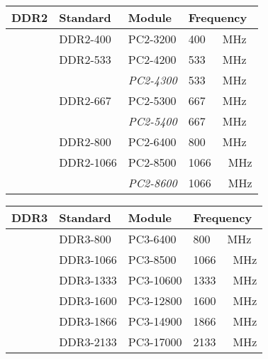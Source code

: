 \documentclass[a4paper]{article}
\newcommand{\mhz}[1]{\si{\num{#1}\ \mega\hertz}}
\begin{document}
	\begin{minipage}[t]{.4\textwidth}
		\raggedleft
		\begin{table}[H]
			\def\arraystretch{2}
			\begin{tabular}{l l l l}
				DDR2 & Standard         & Module          & Frequency \\ \hline
				& DDR2-400 & PC2-3200 & \mhz{400} \\
				& DDR2-533 & PC2-4200 & \mhz{533} \\
				&  & \textit{PC2-4300} & \mhz{533} \\
				& DDR2-667 & PC2-5300 & \mhz{667} \\
				& & \textit{PC2-5400} & \mhz{667} \\
				& DDR2-800 & PC2-6400 & \mhz{800} \\
				& DDR2-1066 & PC2-8500 & \mhz{1066} \\
				& & \textit{PC2-8600} & \mhz{1066} \\
				\hline
			\end{tabular}
		\end{table}
	
		\begin{table}[H]
			\def\arraystretch{2}
			\begin{tabular}{l l l l}
				DDR3 & Standard         & Module          & Frequency \\ \hline
				& DDR3-800 & PC3-6400 & \mhz{800} \\
				& DDR3-1066 & PC3-8500 & \mhz{1066} \\
				& DDR3-1333 & PC3-10600 & \mhz{1333} \\
				& DDR3-1600 & PC3-12800 & \mhz{1600} \\
				& DDR3-1866 & PC3-14900 & \mhz{1866} \\
				& DDR3-2133 & PC3-17000 & \mhz{2133} \\
				\hline
			\end{tabular}
		\end{table}
	\end{minipage}
\end{document}
